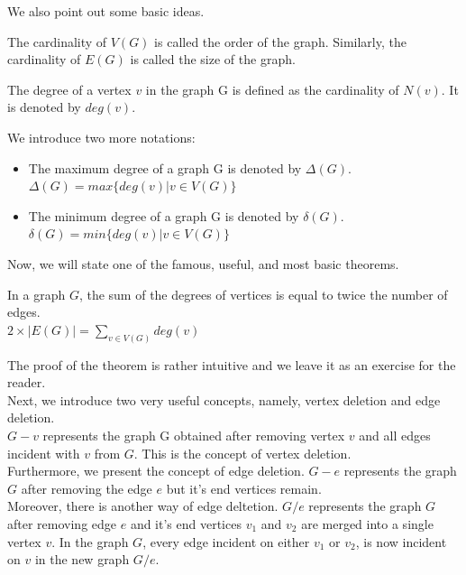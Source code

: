 We also point out some basic ideas.
\begin{defn}
    The cardinality of $V(G)$ is called the order of the graph. Similarly, the cardinality of $E(G)$ is called the size of the graph.
\end{defn}

\begin{defn}
    The degree of a vertex $v$ in the graph G is defined as the cardinality of $N(v)$. It is denoted by $deg(v)$.
\end{defn}

We introduce two more notations:
\begin{itemize}
    \item The maximum degree of a graph G is denoted by $\Delta(G)$.\\
    $\Delta(G)=max\{deg(v)|v \in V(G)\}$
    \item The minimum degree of a graph G is denoted by $\delta(G)$.\\
    $\delta(G)=min\{deg(v)|v \in V(G)\}$
\end{itemize}

Now, we will state one of the famous, useful, and most basic theorems.
\begin{thm}
    In a graph $G$, the sum of the degrees of vertices is equal to twice the number of edges.\\
    $2 \times |E(G)|=\sum_{v \in V(G)}deg(v)$ 
\end{thm}

The proof of the theorem is rather intuitive and we leave it as an exercise for the reader.\\

Next, we introduce two very useful concepts, namely, vertex deletion and edge deletion.\\

$G-v$ represents the graph G obtained after removing vertex $v$ and all edges incident with $v$ from $G$. This is the concept of vertex deletion.\\

Furthermore, we present the concept of edge deletion. $G-e$ represents the graph $G$ after removing the edge $e$ but it's end vertices remain.\\

Moreover, there is another way of edge deltetion. $G/e$ represents the graph $G$ after removing edge $e$ and it's end vertices $v_1$ and $v_2$ are merged into a single vertex $v$. In the graph $G$, every edge incident on either $v_1$ or $v_2$, is now incident on $v$ in the new graph $G/e$.\\ 

